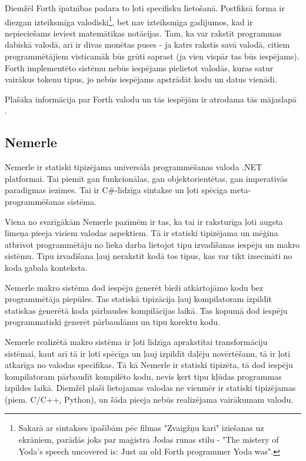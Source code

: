 Diemžēl Forth īpatnības padara to ļoti specifisku lietošanā. Postfiksā forma ir diezgan izteiksmīga valodiski\footnote{Sakarā ar sintakses īpašībām pēc filmas "Zvaigžņu kari" iziešanas uz ekrāniem, parādās joks par maģistra Jodas runas stilu - "The mistery of Yoda’s speech uncovered is: Just an old Forth programmer Yoda was".}, bet nav izteiksmīga gadījumos, kad ir nepieciešams ieviest matemātikas notācijas. Tam, ka var rakstīt programmas dabiskā valodā, arī ir divas monētas puses - ja katrs rakstīs savā valodā, citiem programmētājiem visticamāk būs grūti saprast (ja vien vispār tas būs iespējams). Forth implementēto sistēmu nebūs iespējams pielietot valodās, kuras satur vairākus tokenu tipus, jo nebūs iespējams apstrādāt kodu un datus vienādi.

Plašāka informācija par Forth valodu un tās iespējām ir atrodama tās mājaslapā \cite{ForthHome}.

\subsection{\label{sbs:rel_nemerle}Nemerle}

Nemerle ir statiski tipizējama universāla programmēšanas valoda .NET platformai. Tai piemīt gan funkcionālas, gan objektorientētas, gan imperativās paradigmas iezīmes. Tai ir C\#-līdzīga sintakse un ļoti spēcīga meta-programmēšanas sistēma.

Viena no svarīgākām Nemerle pazīmēm ir tas, ka tai ir raksturīga ļoti augsta līmeņa pieeja visiem valodas aspektiem. Tā ir statiski tipizējama un mēģina atbrīvot programmētāju no lieka darba lietojot tipu izvadīšanas iespēju un makro sistēmu. Tipu izvadīšana ļauj nerakstīt kodā tos tipus, kas var tikt izsecināti no koda gabala konteksta.

Nemerle makro sistēma dod iespēju ģenerēt bieži atkārtojāmo kodu bez programmētāja piepūles. Tas statiskā tipizācija ļauj kompilatoram izpildīt statiskas ģenerētā koda pārbaudes kompilācijas laikā. Tas kopumā dod iespēju programmatiski ģenerēt pārbaudāmu un tipu korektu kodu.

Nemerle realizētā makro sistēma ir ļoti līdzīga aprakstītai transformāciju sistēmai, kaut arī tā ir ļoti spēcīga un ļauj izpildīt daļēju novērtēšanu, tā ir ļoti atkarīga no valodas specifikas. Tā kā Nemerle ir statiski tipizēta, tā dod iespēju kompilatoram pārbaudīt kompilēto kodu, nevis ķert tipu kļūdas programmas izpildes laikā. Diemžēl plaši lietojamas valodas ne vienmēr ir statiski tipizējamas (piem. C/C++, Python), un šāda pieeja nebūs realizējama vairākumam valodu. 

